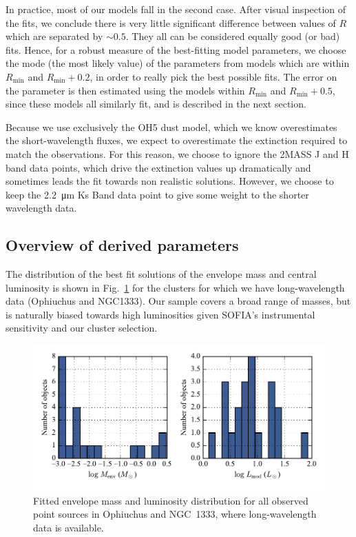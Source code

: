 In practice, most of our models fall in the second case. After visual inspection of the fits, we conclude there is very little significant difference between values of $R$ which are separated by $\sim 0.5$. They all can be considered equally good (or bad) fits. Hence, for a robust measure of the best-fitting model parameters, we choose the mode (the most likely value) of the parameters from models which are within $R_\textrm{min}$ and $R_\textrm{min}+0.2$, in order to really pick the best possible fits. The error on the parameter is then estimated using the models within $R_\textrm{min}$ and $R_\textrm{min}+0.5$, since these models all similarly fit, and is described in the next section.

Because we use exclusively the OH5 dust model, which we know overestimates the short-wavelength fluxes, we expect to overestimate the extinction required to match the observations. For this reason, we choose to ignore the 2MASS J and H band data points, which drive the extinction values up dramatically and sometimes leads the fit towards non realistic solutions. However, we choose to keep the \SI{2.2}{\um} Ks Band data point to give some weight to the shorter wavelength data.

\subsection{Overview of derived parameters}

The distribution of the best fit solutions of the envelope mass and central luminosity is shown in Fig.~\ref{fig:MassLumHist} for the clusters for which we have long-wavelength data (Ophiuchus and NGC1333). Our sample covers a broad range of masses, but is naturally biased towards high luminosities given SOFIA's instrumental sensitivity and our cluster selection.


\begin{figure}[!h]
\begin{center}
\includegraphics[width=\textwidth]{Figures/MassLumHist.pdf}
\vspace{-1cm}
\caption[Fitted envelope mass and luminosity distribution]{Fitted envelope mass and luminosity distribution for all observed point sources in Ophiuchus and NGC~1333, where long-wavelength data is available.}
\label{fig:MassLumHist}
\end{center}
\end{figure}

